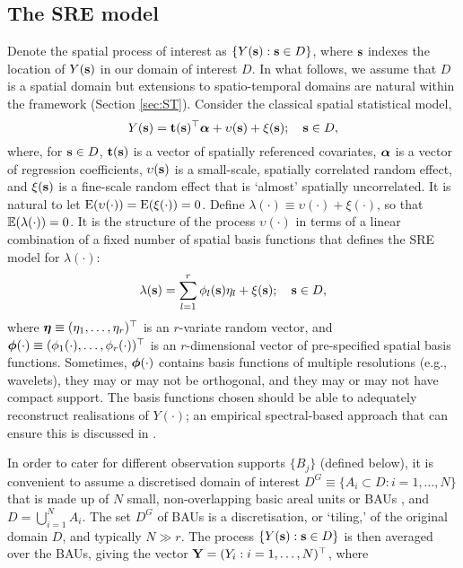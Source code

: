 \subsection{The SRE model} \label{sec:SREModel}

Denote the spatial process of interest as $\{Y(\textbf{s}) : \textbf{s} \in D\}$, where $\textbf{s}$ indexes the location of $Y(\textbf{s})$ in our domain of interest $D$. In what follows, we assume that $D$ is a spatial domain but extensions to spatio-temporal domains are natural within the framework (Section \ref{sec:ST}). Consider the classical spatial statistical model,
\begin{equation*}
Y(\textbf{s}) = \textbf{t}(\textbf{s})^\top{\boldsymbol{\alpha}} + \upsilon(\textbf{s}) + \xi(\textbf{s}); \quad \textbf{s} \in D,
\end{equation*}
where, for $\textbf{s} \in D$, $\textbf{t}(\textbf{s})$ is a vector of spatially referenced covariates, ${\boldsymbol{\alpha}}$ is a vector of regression coefficients, $\upsilon(\textbf{s})$ is a small-scale, spatially correlated random effect, and $\xi(\textbf{s})$ is a fine-scale random effect that is `almost' spatially uncorrelated. It is natural to let $\mathrm{E}(\upsilon(\cdot)) = \mathrm{E}(\xi(\cdot)) = 0$. Define $\lambda(\cdot) \equiv \upsilon(\cdot) + \xi(\cdot)$, so that ${\mathbb{E}}(\lambda(\cdot)) = 0$. It is the structure of the process $\upsilon(\cdot)$ in terms of a linear combination of a fixed number of spatial basis functions that defines the SRE model for $\lambda(\cdot)$:
$$
\lambda(\textbf{s}) = \sum_{l=1}^r \phi_l(\textbf{s})\eta_l + \xi(\textbf{s});\quad \textbf{s} \in D,
$$
\noindent where $\boldsymbol{\eta} \equiv (\eta_1,\dots,\eta_r)^\top$ is an $r$-variate random vector, and $\boldsymbol{\phi}(\cdot) \equiv (\phi_1(\cdot),\dots,\phi_r(\cdot))^\top$ is an $r$-dimensional vector of pre-specified spatial basis functions. Sometimes, $\boldsymbol{\phi}(\cdot)$ contains basis functions of multiple resolutions (e.g., wavelets), they may or may not be orthogonal, and they may or may not have compact support. The basis functions chosen should be able to adequately reconstruct realisations of $Y(\cdot)$; an empirical spectral-based approach that can ensure this is discussed in \cite{Zammit_2012}.

In order to cater for different observation supports $\{B_j\}$ (defined below), it is convenient to assume a discretised domain of interest $D^G \equiv \{A_i \subset D: i = 1,\dots,N\}$ that is made up of $N$ small, non-overlapping basic areal units or BAUs \citep{Nguyen_2012}, and $D = \bigcup_{i=1}^N A_i$. The set $D^G$ of BAUs is a discretisation, or `tiling,' of the original domain $D$, and typically $N \gg r$. The process $\{Y(\textbf{s}): \textbf{s} \in D\}$ is then averaged over the BAUs, giving the vector $\mathbf{Y} = (Y_i : i = 1,\dots,N)^\top$, where

